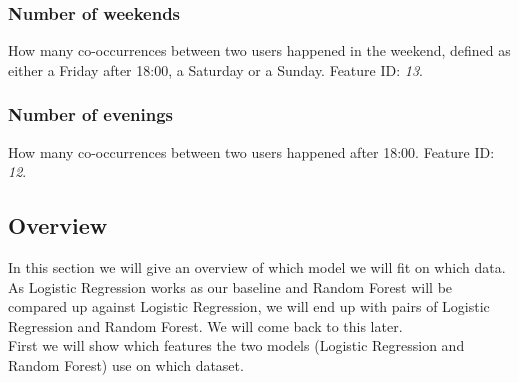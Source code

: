 \subsubsection{Number of weekends}
How many co-occurrences between two users happened in the weekend, defined as either a Friday after 18:00, a Saturday or a Sunday.
Feature ID: \textit{13}.

\subsubsection{Number of evenings}
How many co-occurrences between two users happened after 18:00.
Feature ID: \textit{12}.

\subsection{Overview}
In this section we will give an overview of which model we will fit on which data. As Logistic Regression works as our baseline and Random Forest will be compared up against Logistic Regression, we will end up with pairs of Logistic Regression and Random Forest. We will come back to this later. \\
First we will show which features the two models (Logistic Regression and Random Forest) use on which dataset. 
